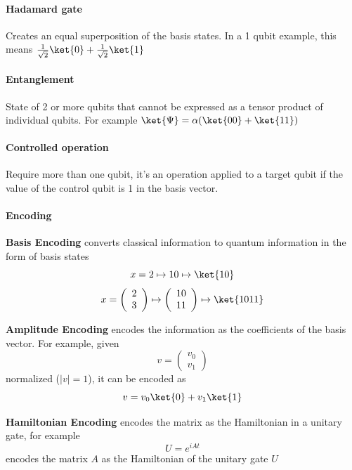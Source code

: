 \documentclass[10pt]{report}
\begin{document}
\paragraph{Hadamard gate} Creates an equal superposition of the basis states. In a 1 qubit example, this means $\frac{1}{\sqrt{2}}\ket{0}+\frac{1}{\sqrt{2}}\ket{1}$
\paragraph{Entanglement} State of 2 or more qubits that cannot be expressed as a tensor product of individual qubits. For example $\ket{\Psi}=\alpha(\ket{00}+\ket{11})$
\paragraph{Controlled operation} Require more than one qubit, it's an operation applied to a target qubit if the value of the control qubit is 1 in the basis vector.
\paragraph{Encoding}
\begin{list}{}{}
	\item \textbf{Basis Encoding} converts classical information to quantum information in the form of basis states
	$$x=2\mapsto 10\mapsto\ket{10}$$
	$$x=\left(\begin{array}{c}
	2\\3
	\end{array}\right)\mapsto\left(\begin{array}{c}
	10\\11
	\end{array}\right)\mapsto\ket{1011}$$
	\item \textbf{Amplitude Encoding} encodes the information as the coefficients of the basis vector. For example, given $$v=\left(\begin{array}{c}
	v_0\\v_1
	\end{array}\right)$$ normalized ($|v|=1$), it can be encoded as $$v = v_0\ket{0}+v_1\ket{1}$$
	\item \textbf{Hamiltonian Encoding} encodes the matrix as the Hamiltonian in a unitary gate, for example $$U=e^{iAt}$$ encodes the matrix $A$ as the Hamiltonian of the unitary gate $U$
\end{list}
\end{document}
